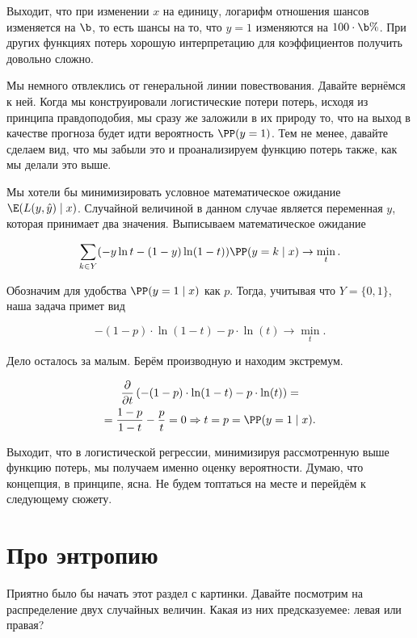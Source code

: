 Выходит, что при изменении $x$ на единицу, логарифм отношения шансов изменяется на $\b$, то есть шансы на то, что $y=1$ изменяются на $100 \cdot \b \%$. При других функциях потерь хорошую интерпретацию для коэффициентов получить довольно сложно.

Мы немного отвлеклись от генеральной линии повествования. Давайте вернёмся к ней. Когда мы конструировали логистические потери потерь, исходя из принципа правдоподобия, мы сразу же заложили в их природу то, что на выход в качестве прогноза будет идти вероятность $\PP(y = 1)$. Тем не менее, давайте сделаем вид, что мы забыли это и проанализируем функцию потерь также, как мы делали это выше. 

Мы хотели бы минимизировать условное математическое ожидание  $\E(L(y, \hat y) \mid x)$. Случайной величиной в данном случае является переменная $y$, которая принимает два значения. Выписываем математическое ожидание

\[ 
\sum_{k \in Y} (-y \ln t - (1-y) \ln(1-t)) \PP(y = k \mid x) \to \min_t.
\] 

Обозначим для удобства $\PP(y = 1 \mid x)$ как $p$. Тогда, учитывая что $Y = \{0,1\}$, наша задача примет вид 

\[ 
-(1-p) \cdot \ln(1-t) - p \cdot \ln(t) \to \min_t.
\]

Дело осталось за малым. Берём производную и находим экстремум. 

\begin{multline*}
\frac{\partial }{\partial t} \left(  -(1-p) \cdot \ln(1-t) - p \cdot \ln(t) \right) = \\ = \frac{1-p}{1-t} - \frac{p}{t} = 0   \Rightarrow t = p = \PP(y = 1 \mid x).
\end{multline*}

Выходит, что в логистической регрессии, минимизируя рассмотренную выше функцию потерь, мы получаем именно оценку вероятности.  Думаю, что концепция, в принципе, ясна. Не будем топтаться на месте и перейдём к следующему сюжету. 

\section{ Про энтропию} 

Приятно было бы начать этот раздел с картинки. Давайте посмотрим на распределение двух случайных величин. Какая из них предсказуемее: левая или правая? 

